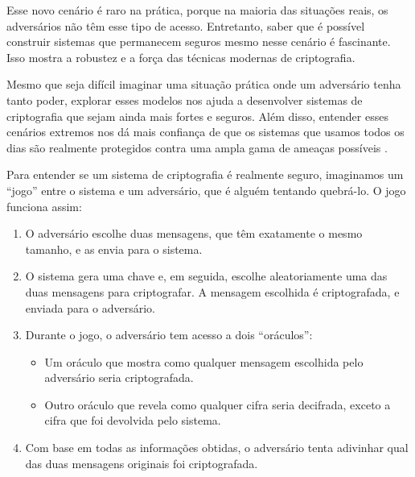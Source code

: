 Esse novo cenário é raro na prática, porque na maioria das situações reais, os adversários não têm esse tipo de acesso. Entretanto, saber que é possível construir sistemas que permanecem seguros mesmo nesse cenário é fascinante. Isso mostra a robustez e a força das técnicas modernas de criptografia.

Mesmo que seja difícil imaginar uma situação prática onde um adversário tenha tanto poder, explorar esses modelos nos ajuda a desenvolver sistemas de criptografia que sejam ainda mais fortes e seguros.
Além disso, entender esses cenários extremos nos dá mais confiança de que os sistemas que usamos todos os dias são realmente protegidos contra uma ampla gama de ameaças possíveis \cite{Naor90}.

Para entender se um sistema de criptografia é realmente seguro, imaginamos um ``jogo'' entre o sistema e um adversário, que é alguém tentando quebrá-lo.
O jogo funciona assim:
\begin{enumerate}
\item O adversário escolhe duas mensagens, que têm exatamente o mesmo tamanho, e as envia para o sistema.
\item O sistema gera uma chave e, em seguida, escolhe aleatoriamente uma das duas mensagens para criptografar.
  A mensagem escolhida é criptografada, e enviada para o adversário.
\item Durante o jogo, o adversário tem acesso a dois ``oráculos'':
  \begin{itemize}
  \item Um oráculo que mostra como qualquer mensagem escolhida pelo adversário seria criptografada.
  \item Outro oráculo que revela como qualquer cifra seria decifrada, exceto a cifra que foi devolvida pelo sistema.
  \end{itemize}
\item Com base em todas as informações obtidas, o adversário tenta adivinhar qual das duas mensagens originais foi criptografada.
\end{enumerate}

\begin{center}
\end{center}

